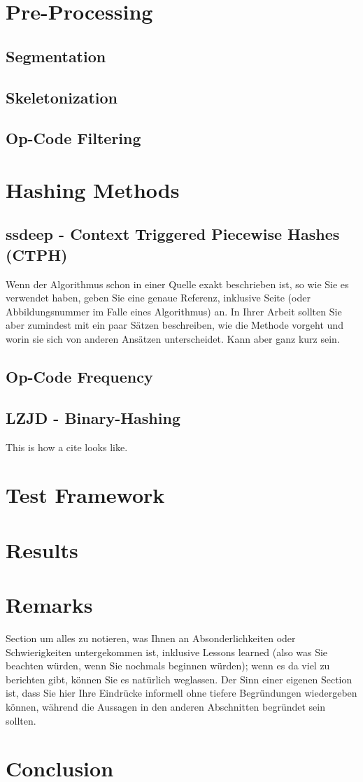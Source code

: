 \documentclass{article}
\begin{document}
\section{Pre-Processing}
\subsection{Segmentation}
\subsection{Skeletonization}
\subsection{Op-Code Filtering}

\section{Hashing Methods}
\subsection{ssdeep - Context Triggered Piecewise Hashes (CTPH)}
Wenn der Algorithmus schon in einer Quelle exakt beschrieben ist, so wie
Sie es verwendet haben, geben Sie eine genaue Referenz, inklusive Seite
(oder Abbildungsnummer im Falle eines Algorithmus) an. In Ihrer Arbeit
sollten Sie aber zumindest mit ein paar Sätzen beschreiben, wie die
Methode vorgeht und worin sie sich von anderen Ansätzen unterscheidet.
Kann aber ganz kurz sein.

\subsection{Op-Code Frequency}
\subsection{LZJD - Binary-Hashing}
This is how a cite\cite{sung2004static} looks like.

\section{Test Framework}
\section{Results}
\section{Remarks}
Section um alles zu notieren, was Ihnen an Absonderlichkeiten oder Schwierigkeiten untergekommen
ist, inklusive Lessons learned (also was Sie beachten würden, wenn Sie nochmals
beginnen würden); wenn es da viel zu berichten gibt, können Sie es
natürlich weglassen. Der Sinn einer eigenen Section ist, dass Sie hier
Ihre Eindrücke informell ohne tiefere Begründungen wiedergeben können,
während die Aussagen in den anderen Abschnitten begründet sein sollten.

\section{Conclusion}

\printbibliography
\end{document}
